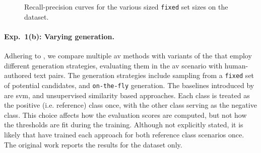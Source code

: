 \begin{figure}[htbp]
    \centering
    
    \caption[Recall-precision curves for the various sized \imp{} set sizes.]{Recall-precision curves for the various sized \texttt{fixed} \imp{} set sizes on the \dataBlog{} dataset.
    }
    \label{fig:blog_dif_n}
\end{figure}



%     
%     


\paragraph{Exp.\ 1(b): Varying \imp{} generation.}

Adhering to \citet{koppel_determining_2014}, we compare multiple \ac{av} methods with variants of the \impAppr{} that employ different \imp{} generation strategies, evaluating them in the \ac{av} scenario with human-authored text pairs.
The \imp{} generation strategies include sampling from a \texttt{fixed} set of potential \imp{} candidates, and \texttt{on-the-fly} \imp{} generation. 
The baselines introduced by \citet{koppel_determining_2014} are \ac{svm}, and unsupervised similarity based approaches.
Each class is treated as the positive (i.e. reference) class once, with the other class serving as the negative class. 
This choice affects how the evaluation scores are computed, but not how the thresholds are fit during the training.
Although not explicitly stated, it is likely that \citet{koppel_determining_2014} have trained each approach for both reference class scenarios once.
The original work reports the results for the \dataBlog{} dataset only.

